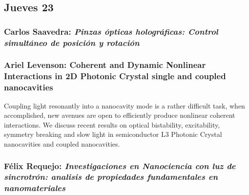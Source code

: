 \subsection*{Jueves 23}

\subsubsection*{Carlos Saavedra: \textit{Pinzas \'opticas hologr\'aficas:
Control simult\'aneo de posici\'on y rotaci\'on}}

\subsubsection*{Ariel Levenson: Coherent and Dynamic Nonlinear Interactions in
2D Photonic Crystal single and coupled nanocavities}

Coupling light resonantly into a nanocavity mode is a
rather difficult task, when accomplished, new avenues are open to
efficiently produce nonlinear coherent interactions. We discuss recent
results on optical bistability, excitability, symmetry breaking and
slow light in semiconductor L3 Photonic Crystal nanocavities and
coupled nanocavities.

\subsubsection*{F\'elix Requejo: \textit{Investigaciones en Nanociencia con luz
de sincrotr\'on: analisis de propiedades fundamentales en nanomateriales}}